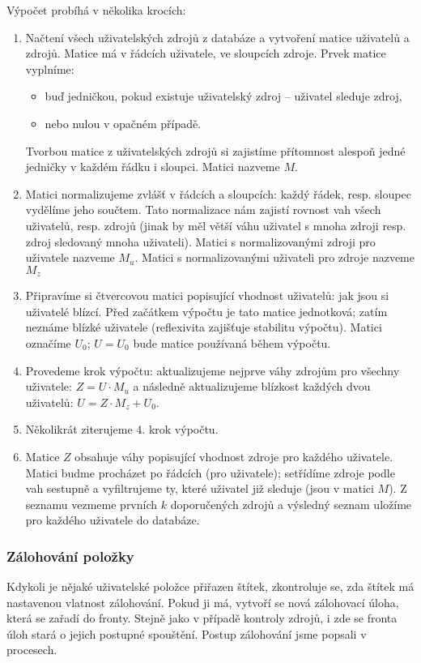 Výpočet probíhá v několika krocích:
\begin{enumerate}
	\item Načtení všech uživatelských zdrojů z databáze a vytvoření matice uživatelů a zdrojů.
		Matice má v řádcích uživatele, ve sloupcích zdroje.
		Prvek matice vyplníme:
		\begin{itemize}
			\item buď jedničkou, pokud existuje uživatelský zdroj – uživatel sleduje zdroj,
			\item nebo nulou v opačném případě.
		\end{itemize}
		Tvorbou matice z uživatelských zdrojů si zajistíme přítomnost alespoň jedné jedničky v každém řádku i sloupci.
		Matici nazveme $M$.
	\item Matici normalizujeme zvlášť v řádcích a sloupcích: každý řádek, resp. sloupec vydělíme jeho součtem.
		Tato normalizace nám zajistí rovnost vah všech uživatelů, resp. zdrojů (jinak by měl větší váhu uživatel s mnoha zdroji resp. zdroj sledovaný mnoha uživateli).
		Matici s normalizovanými zdroji pro uživatele nazveme $M_u$.
		Matici s normalizovanými uživateli pro zdroje nazveme $M_z$
	\item Připravíme si čtvercovou matici popisující vhodnost uživatelů: jak jsou si uživatelé blízcí.
		Před začátkem výpočtu je tato matice jednotková; zatím neznáme blízké uživatele (reflexivita zajišťuje stabilitu výpočtu).
		Matici označíme $U_0$; $U = U_0$ bude matice používaná během výpočtu.
	\item Provedeme krok výpočtu:
		aktualizujeme nejprve váhy zdrojům pro všechny uživatele:
			$ Z = U \cdot M_u $
		a následně aktualizujeme blízkost každých dvou uživatelů:
			$ U = Z \cdot M_z + U_0 $.
	\item Několikrát ziterujeme 4. krok výpočtu.
	\item Matice $Z$ obsahuje váhy popisující vhodnost zdroje pro každého uživatele.
		Matici budme procházet po řádcích (pro uživatele); setřídíme zdroje podle vah sestupně a vyfiltrujeme ty, které uživatel již sleduje (jsou v matici $M$).
		Z seznamu vezmeme prvních $k$ doporučených zdrojů a výsledný seznam uložíme pro každého uživatele do databáze.
\end{enumerate}

\subsubsection{Zálohování položky}

Kdykoli je nějaké uživatelské položce přiřazen štítek, zkontroluje se, zda štítek má nastavenou vlatnost zálohování.
Pokud ji má, vytvoří se nová zálohovací úloha, která se zařadí do fronty.
Stejně jako v případě kontroly zdrojů, i zde se fronta úloh stará o jejich postupné spouštění.
Postup zálohování jsme popsali v procesech. %

